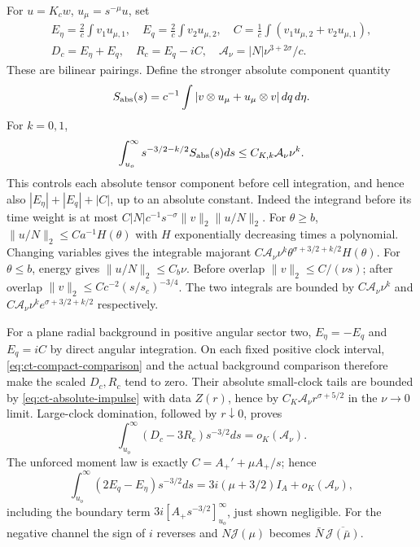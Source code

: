 For $u=K_cw$, $u_\mu=s^{-\mu}u$, set
\[
\begin{gathered}
 E_\eta=\frac2c\int v_1u_{\mu,1},\quad
 E_q=\frac2c\int v_2u_{\mu,2},\quad
 C=\frac1c\int(v_1u_{\mu,2}+v_2u_{\mu,1}),\\
 D_c=E_\eta+E_q,\quad R_c=E_q-iC,\quad
 \mathcal A_\nu=|N|\nu^{3+2\sigma}/c.
\end{gathered}
\]
These are bilinear pairings. Define the stronger absolute component
quantity
\[
 S_{\rm abs}(s)=c^{-1}\int
       |v\otimes u_\mu+u_\mu\otimes v|\,dq\,d\eta.
\]
For $k=0,1$,
\begin{equation}\label{eq:ct-absolute-stress}
 \int_{u_o}^\infty s^{-3/2-k/2}
       S_{\rm abs}(s)ds\le C_{K,k}\mathcal A_\nu\nu^k.
\end{equation}
This controls each absolute tensor component before cell integration,
and hence also $|E_\eta|+|E_q|+|C|$, up to an absolute constant.
Indeed the integrand before its time weight is at most
$C|N|c^{-1}s^{-\sigma}\|v\|_2\|u/N\|_2$.
For $\theta\ge b$, $\|u/N\|_2\le Ca^{-1}H(\theta)$ with
$H$ exponentially decreasing times a polynomial. Changing variables
gives the integrable majorant
$C\mathcal A_\nu\nu^k\theta^{\sigma+3/2+k/2}H(\theta)$.
For $\theta\le b$, energy gives $\|u/N\|_2\le C_b\nu$.
Before overlap $\|v\|_2\le C/(\nu s)$; after overlap
$\|v\|_2\le Cc^{-2}(s/s_c)^{-3/4}$.
The two integrals are bounded by
$C\mathcal A_\nu\nu^k$ and
$C\mathcal A_\nu\nu^ke^{\sigma+3/2+k/2}$ respectively.

For a plane radial background in positive angular sector two,
$E_\eta=-E_q$ and $E_q=iC$ by direct angular integration.
On each fixed positive clock interval,
\eqref{eq:ct-compact-comparison} and the actual background comparison
therefore make the scaled $D_c,R_c$ tend to zero. Their absolute
small-clock tails are bounded by \eqref{eq:ct-absolute-impulse} with
data $Z(r)$, hence by $C_K\mathcal A_\nu r^{\sigma+5/2}$ in the
$\nu\to0$ limit. Large-clock domination, followed by $r\downarrow0$,
proves
\begin{equation}\label{eq:ct-stress-defect}
 \int_{u_o}^{\infty}(D_c-3R_c)s^{-3/2}ds=o_K(\mathcal A_\nu).
\end{equation}
The unforced moment law is exactly $C=A_+'+\mu A_+/s$; hence
\begin{equation}\label{eq:ct-anisotropy}
 \int_{u_o}^{\infty}(2E_q-E_\eta)s^{-3/2}ds
   =3i(\mu+3/2)I_A+o_K(\mathcal A_\nu),
\end{equation}
including the boundary term
$3i[A_+s^{-3/2}]_{u_o}^{\infty}$, just shown negligible.
For the negative channel the sign of $i$ reverses and
$N\mathcal J(\mu)$ becomes
$\bar N\,\overline{\mathcal J(\bar\mu)}$.
